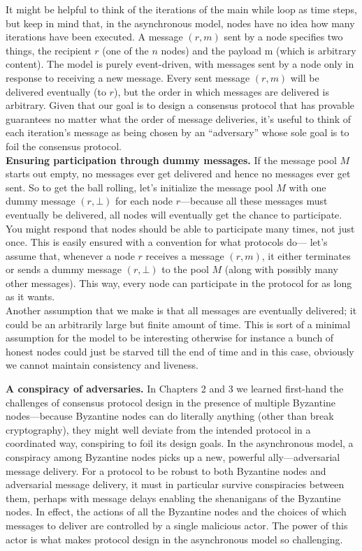 It might be helpful to think of the iterations of the main while loop as time steps, but keep
in mind that, in the asynchronous model, nodes have no idea how many iterations have
been executed. A message $(r, m)$ sent by a node specifies two things, the recipient $r$ (one of
the $n$ nodes) and the payload m (which is arbitrary content). The model is purely event-driven, with messages sent by a node only in response to receiving a new message. Every sent message $(r, m)$ will be delivered eventually (to $r$), but the order in which messages
are delivered is arbitrary. Given that our goal is to design a consensus protocol that has
provable guarantees no matter what the order of message deliveries, it’s useful to think of
each iteration’s message as being chosen by an “adversary” whose sole goal is to foil the
consensus protocol.\\

\noindent
\textbf{Ensuring participation through dummy messages.} If the message pool $M$ starts out
empty, no messages ever get delivered and hence no messages ever get sent. So to get the
ball rolling, let’s initialize the message pool $M$ with one dummy message $(r, \bot)$ for each
node $r$—because all these messages must eventually be delivered, all nodes will eventually
get the chance to participate. You might respond that nodes should be able to participate
many times, not just once. This is easily ensured with a convention for what protocols do—
let’s assume that, whenever a node $r$ receives a message $(r, m)$, it either terminates or sends
a dummy message $(r, \bot)$ to the pool $M$ (along with possibly many other messages). This
way, every node can participate in the protocol for as long as it wants.\\
Another assumption that we make is that all messages are eventually delivered; it could be an arbitrarily large but finite amount of time. This is sort of a minimal assumption for the model to be interesting otherwise for instance a bunch of honest nodes could just be starved till the end of time and in this case, obviously we cannot maintain consistency and liveness.

\noindent
\textbf{A conspiracy of adversaries.} In Chapters 2 and 3 we learned first-hand the challenges of
consensus protocol design in the presence of multiple Byzantine nodes—because Byzantine
nodes can do literally anything (other than break cryptography), they might well deviate
from the intended protocol in a coordinated way, conspiring to foil its design goals.
In the asynchronous model, a conspiracy among Byzantine nodes picks up a new, powerful
ally—adversarial message delivery. For a protocol to be robust to both Byzantine nodes
and adversarial message delivery, it must in particular survive conspiracies between them,
perhaps with message delays enabling the shenanigans of the Byzantine nodes. In effect, the
actions of all the Byzantine nodes and the choices of which messages to deliver are controlled
by a single malicious actor. The power of this actor is what makes protocol design in the
asynchronous model so challenging.\\

